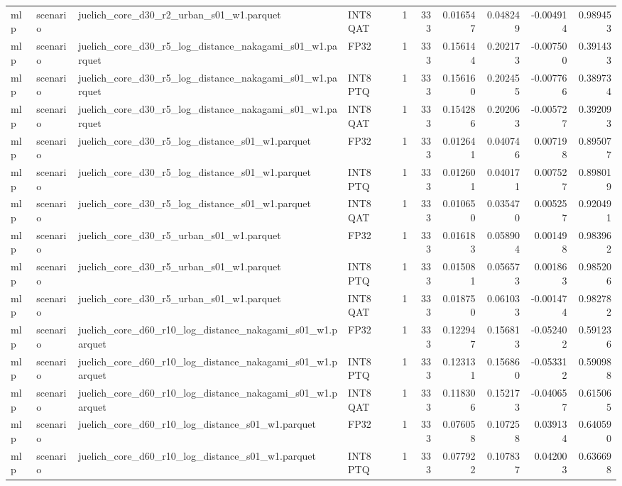 \begin{tabular}{llllrrrrrr}
mlp & scenario & juelich\_core\_d30\_r2\_urban\_s01\_w1.parquet & INT8 QAT & 1 & 333 & 0.016547 & 0.048249 & -0.004914 & 0.989453 \\
mlp & scenario & juelich\_core\_d30\_r5\_log\_distance\_nakagami\_s01\_w1.parquet & FP32 & 1 & 333 & 0.156144 & 0.202173 & -0.007500 & 0.391433 \\
mlp & scenario & juelich\_core\_d30\_r5\_log\_distance\_nakagami\_s01\_w1.parquet & INT8 PTQ & 1 & 333 & 0.156160 & 0.202455 & -0.007766 & 0.389734 \\
mlp & scenario & juelich\_core\_d30\_r5\_log\_distance\_nakagami\_s01\_w1.parquet & INT8 QAT & 1 & 333 & 0.154286 & 0.202063 & -0.005727 & 0.392093 \\
mlp & scenario & juelich\_core\_d30\_r5\_log\_distance\_s01\_w1.parquet & FP32 & 1 & 333 & 0.012641 & 0.040746 & 0.007198 & 0.895077 \\
mlp & scenario & juelich\_core\_d30\_r5\_log\_distance\_s01\_w1.parquet & INT8 PTQ & 1 & 333 & 0.012601 & 0.040171 & 0.007527 & 0.898019 \\
mlp & scenario & juelich\_core\_d30\_r5\_log\_distance\_s01\_w1.parquet & INT8 QAT & 1 & 333 & 0.010650 & 0.035470 & 0.005257 & 0.920491 \\
mlp & scenario & juelich\_core\_d30\_r5\_urban\_s01\_w1.parquet & FP32 & 1 & 333 & 0.016183 & 0.058904 & 0.001498 & 0.983962 \\
mlp & scenario & juelich\_core\_d30\_r5\_urban\_s01\_w1.parquet & INT8 PTQ & 1 & 333 & 0.015081 & 0.056573 & 0.001863 & 0.985206 \\
mlp & scenario & juelich\_core\_d30\_r5\_urban\_s01\_w1.parquet & INT8 QAT & 1 & 333 & 0.018750 & 0.061033 & -0.001474 & 0.982782 \\
mlp & scenario & juelich\_core\_d60\_r10\_log\_distance\_nakagami\_s01\_w1.parquet & FP32 & 1 & 333 & 0.122947 & 0.156813 & -0.052402 & 0.591236 \\
mlp & scenario & juelich\_core\_d60\_r10\_log\_distance\_nakagami\_s01\_w1.parquet & INT8 PTQ & 1 & 333 & 0.123131 & 0.156860 & -0.053312 & 0.590988 \\
mlp & scenario & juelich\_core\_d60\_r10\_log\_distance\_nakagami\_s01\_w1.parquet & INT8 QAT & 1 & 333 & 0.118306 & 0.152173 & -0.040657 & 0.615065 \\
mlp & scenario & juelich\_core\_d60\_r10\_log\_distance\_s01\_w1.parquet & FP32 & 1 & 333 & 0.076058 & 0.107258 & 0.039134 & 0.640590 \\
mlp & scenario & juelich\_core\_d60\_r10\_log\_distance\_s01\_w1.parquet & INT8 PTQ & 1 & 333 & 0.077922 & 0.107837 & 0.042003 & 0.636698 \\

\end{tabular}
